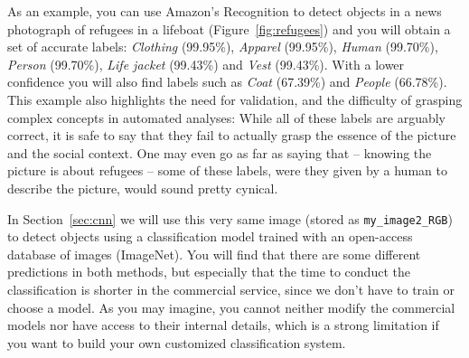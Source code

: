 As an example, you can use Amazon's Recognition to detect objects in a news photograph of refugees in a lifeboat (Figure~\ref{fig:refugees}) and you will obtain a set of accurate labels: \textit{Clothing} (99.95\%), \textit{Apparel} (99.95\%), \textit{Human} (99.70\%), \textit{Person} (99.70\%), \textit{Life jacket} (99.43\%) and \textit{Vest} (99.43\%). With a lower confidence you will also find labels such as \textit{Coat} (67.39\%) and \textit{People} (66.78\%). This example also highlights the need for validation, and the difficulty of grasping complex concepts in automated analyses: While all of these labels are arguably correct, it is safe to say that they fail to actually grasp the essence of the picture and the social context. One may even go as far as saying that -- knowing the picture is about refugees -- some of these labels, were they given by a human to describe the picture, would sound pretty cynical.

In Section~\ref{sec:cnn} we will use this very same image (stored as \texttt{my\_image2\_RGB}) to detect objects using a classification model trained with an open-access database of images (ImageNet). You will find that there are some different predictions in both methods, but especially that the time to conduct the classification is shorter in the commercial service, since we don't have to train or choose a model. As you may imagine, you cannot neither modify the commercial models nor have access to their internal details, which is a strong limitation if you want to build your own customized classification system.
